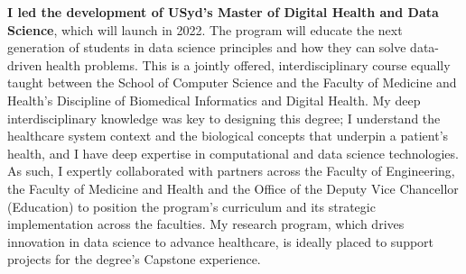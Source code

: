 \documentclass[a4paper]{article}
\begin{document}
%
%
%



\textbf{I led the development of USyd's Master of Digital Health and Data Science}, which will launch in 2022.
The program will educate the next generation of students in data science principles and how they can solve data-driven health problems.
This is a jointly offered, interdisciplinary course equally taught between the School of Computer Science and the Faculty of Medicine and Health's Discipline of Biomedical Informatics and Digital Health.
My deep interdisciplinary knowledge was key to designing this degree; I understand the healthcare system context and the biological concepts that underpin a patient's health, and I have deep expertise in computational and data science technologies.
As such, I expertly collaborated with partners across the Faculty of Engineering, the Faculty of Medicine and Health and the Office of the Deputy Vice Chancellor (Education) to position the program's curriculum and its strategic implementation across the faculties.
My research program, which drives innovation in data science to advance healthcare, is ideally placed to support projects for the degree's Capstone experience.
\end{document}
